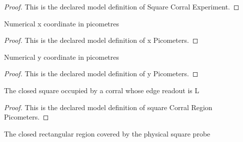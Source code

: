 \begin{proof}
  This is the declared model definition of Square Corral Experiment.
\end{proof}
\begin{definition}[x Picometers]
  \label{def:physics:phyx-mini-0583:phyxminiproblems-problemphyxmini0583-xpicometers}
  Numerical x coordinate in picometres
\end{definition}
\begin{proof}
  This is the declared model definition of x Picometers.
\end{proof}
\begin{definition}[y Picometers]
  \label{def:physics:phyx-mini-0583:phyxminiproblems-problemphyxmini0583-ypicometers}
  Numerical y coordinate in picometres
\end{definition}
\begin{proof}
  This is the declared model definition of y Picometers.
\end{proof}
\begin{definition}
  \label{def:physics:phyx-mini-0583:phyxminiproblems-problemphyxmini0583-squarecorralregionpicometers}
  The closed square occupied by a corral whose edge readout is L
\end{definition}
\begin{proof}
  This is the declared model definition of square Corral Region Picometers.
\end{proof}
\begin{definition}
  \label{def:physics:phyx-mini-0583:phyxminiproblems-problemphyxmini0583-squareproberegionpicometers}
  The closed rectangular region covered by the physical square probe
\end{definition}

